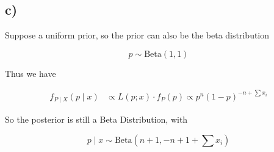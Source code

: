 \documentclass[12pt]{article}
\begin{document}
\begin{flushleft}
\subsection*{c)}

\qquad Suppose a uniform prior, so the prior can also be the beta distribution

$$
p \sim \text{Beta}(1,1)
$$

\qquad Thus we have

\vspace{-0.5cm}

\begin{align*}
f_{P\mid X}(p\mid x) &\propto L(p;x) \cdot f_{P}(p) \propto p^{n}(1-p)^{- n + \sum x_i}
\end{align*}

\qquad So the posterior is still a Beta Distribution, with

$$
p \mid x \sim \text{Beta}(n+1 , -n + 1 + \sum x_i )
$$

\end{flushleft}
\end{document}
